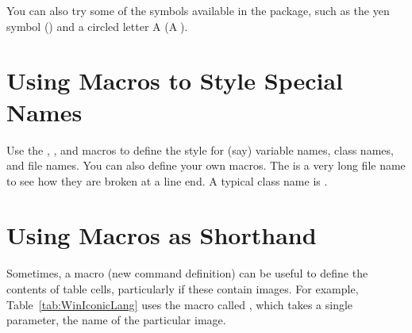 You can also try some of the  symbols available
in the  package, such as the yen symbol (\textyen) and
a circled letter A (\textcircled{A}).



\section{Using Macros to Style Special Names}

Use the , , and  macros to
define the style for (say) variable names, class names, and file
names. You can also define your own macros. The is a very long file
name  to see how they
are broken at a line end. A typical class name is
.




\section{Using Macros as Shorthand}

Sometimes, a macro (new command definition) can be useful to define
the contents of table cells, particularly if these contain images. For
example, Table~\ref{tab:WinIconicLang} uses the macro called
, which takes a single parameter, the name of
the particular image.



